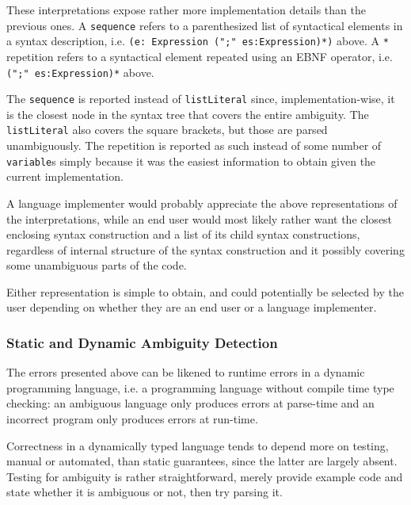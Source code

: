 \documentclass{kththesis}
\begin{document}
These interpretations expose rather more implementation details than the previous ones. A \texttt{sequence} refers to a parenthesized list of syntactical elements in a syntax description, i.e. \texttt{(e: Expression (";" es:Expression)*)} above. A \texttt{*} repetition refers to a syntactical element repeated using an EBNF operator, i.e. \texttt{(";" es:Expression)*} above.

The \texttt{sequence} is reported instead of \texttt{listLiteral} since, implementation-wise, it is the closest node in the syntax tree that covers the entire ambiguity. The \texttt{listLiteral} also covers the square brackets, but those are parsed unambiguously. The repetition is reported as such instead of some number of \texttt{variable}s simply because it was the easiest information to obtain given the current implementation.

A language implementer would probably appreciate the above representations of the interpretations, while an end user would most likely rather want the closest enclosing syntax construction and a list of its child syntax constructions, regardless of internal structure of the syntax construction and it possibly covering some unambiguous parts of the code.

Either representation is simple to obtain, and could potentially be selected by the user depending on whether they are an end user or a language implementer.

\subsubsection{Static and Dynamic Ambiguity Detection} \label{sec:static-dynamic-ambiguity}

The errors presented above can be likened to runtime errors in a dynamic programming language, i.e. a programming language without compile time type checking: an ambiguous language only produces errors at parse-time and an incorrect program only produces errors at run-time.

Correctness in a dynamically typed language tends to depend more on testing, manual or automated, than static guarantees, since the latter are largely absent. Testing for ambiguity is rather straightforward, merely provide example code and state whether it is ambiguous or not, then try parsing it.
\end{document}
